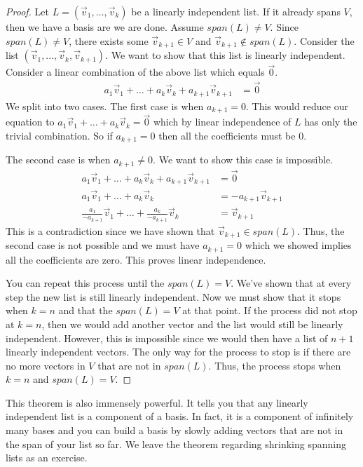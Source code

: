\begin{proof}
    Let $L=(\vec{v}_1,\ldots,\vec{v}_k)$ be a linearly independent list. If it already spans $V$, then we have a basis are we are done. Assume $span(L)\neq V$. Since $span(L)\neq V$, there exists some $\vec{v}_{k+1}\in V$ and $\vec{v}_{k+1}\notin span(L)$. Consider the list $(\vec{v}_1,\ldots,\vec{v}_k,\vec{v}_{k+1})$. We want to show that this list is linearly independent. Consider a linear combination of the above list which equals $\vec{0}$.
    \begin{align*}
        a_1\vec{v}_1+\ldots+a_k\vec{v}_k+a_{k+1}\vec{v}_{k+1}&=\vec{0}
    \end{align*}
    We split into two cases. The first case is when $a_{k+1}=0$. This would reduce our equation to $a_1\vec{v}_1+\ldots+a_k\vec{v}_k=\vec{0}$ which by linear independence of $L$ has only the trivial combination. So if $a_{k+1}=0$ then all the coefficients must be $0$.

    The second case is when $a_{k+1}\neq 0$. We want to show this case is impossible.
    \begin{align*}
        a_1\vec{v}_1+\ldots+a_k\vec{v}_k+a_{k+1}\vec{v}_{k+1}&=\vec{0}\\
        a_1\vec{v}_1+\ldots+a_k\vec{v}_k&=-a_{k+1}\vec{v}_{k+1}\\
        \frac{a_1}{-a_{k+1}}\vec{v}_1+\ldots+\frac{a_k}{-a_{k+1}}\vec{v}_k&=\vec{v}_{k+1}
    \end{align*}
    This is a contradiction since we have shown that $\vec{v}_{k+1}\in span(L)$. Thus, the second case is not possible and we must have $a_{k+1}=0$ which we showed implies all the coefficients are zero. This proves linear independence.

    You can repeat this process until the $span(L)=V$. We've shown that at every step the new list is still linearly independent. Now we must show that it stops when $k=n$ and that the $span(L)=V$ at that point. If the process did not stop at $k=n$, then we would add another vector and the list would still be linearly independent. However, this is impossible since we would then have a list of $n+1$ linearly independent vectors. The only way for the process to stop is if there are no more vectors in $V$ that are not in $span(L)$. Thus, the process stops when $k=n$ and $span(L)=V$.
\end{proof}
This theorem is also immensely powerful. It tells you that any linearly independent list is a component of a basis. In fact, it is a component of infinitely many bases and you can build a basis by slowly adding vectors that are not in the span of your list so far. We leave the theorem regarding shrinking spanning lists as an exercise.

